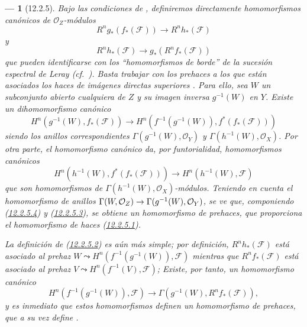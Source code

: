 \documentclass[10pt,oneside,openany]{book}
\theoremstyle{egaenv}\newtheorem*{env}{---}
\theoremstyle{egastatement}
\theoremstyle{egadescription}
\newcommand{\oldpage}[2][]{\marginnote{\normalfont\scriptsize\textbf{#1}\,|\,#2}\ignorespaces}
\renewcommand{\to}{\mathchoice{\longrightarrow}{\rightarrow}{\rightarrow}{\rightarrow}}
\begin{document}
\begin{env}[12.2.5]
\label{0.12.2.5}
\label{0.12.2.5-fr}
Bajo las condiciones de , definiremos directamente
homomorfismos canónicos de $\mathcal O_Z$-módulos
\[
\label{0.12.2.5.1-fr}
\tag{12.2.5.1}
R^n g_*(f_*(\mathcal F))\longrightarrow R^n h_*(\mathcal F)
\]
y
\[
\label{0.12.2.5.2-fr}
\tag{12.2.5.2}
R^n h_*(\mathcal F)\longrightarrow g_*(R^n f_*(\mathcal F))
\]
\oldpage[0\textsubscript{III}]{59}
que pueden identificarse con los ``homomorfismos de borde'' de la sucesión
espectral de Leray (cf.\ ).
Basta trabajar con los prehaces a los que están asociados los haces de
imágenes directas superiores .
Para ello, sea $W$ un subconjunto abierto cualquiera de $Z$ y su imagen inversa $g^{-1}(W)$ en $Y$.  Existe un
dihomomorfismo canónico
\[
\label{0.12.2.5.3-fr}
\tag{12.2.5.3}
H^n(g^{-1}(W),f_*(\mathcal F))\longrightarrow
H^n(f^{-1}(g^{-1}(W)),f^*(f_*(\mathcal F)))
\]
siendo los anillos correspondientes
$\Gamma(g^{-1}(W),\mathcal O_Y)$ y
$\Gamma(h^{-1}(W),\mathcal O_X)$.
Por otra parte, el homomorfismo canónico
 da, por funtorialidad,
homomorfismos canónicos
\[
\label{0.12.2.5.4-fr}
\tag{12.2.5.4}
H^n(h^{-1}(W),f^*(f_*(\mathcal F)))\longrightarrow
H^n(h^{-1}(W),\mathcal F)
\]
que son homomorfismos de
$\Gamma(h^{-1}(W),\mathcal O_X)$-módulos.
Teniendo en cuenta el homomorfismo de anillos
$\Gamma(W,\mathcal O_Z)\to\Gamma(g^{-1}(W),\mathcal O_Y)$, se ve que, componiendo (\hyperref[0.12.2.5.4-fr]{12.2.5.4}) y (\hyperref[0.12.2.5.3-fr]{12.2.5.3}), se obtiene un homomorfismo de prehaces, que proporciona el homomorfismo de haces (\hyperref[0.12.2.5.1-fr]{12.2.5.1}).

La definición de (\hyperref[0.12.2.5.2-fr]{12.2.5.2}) es aún más simple; por definición, $R^n h_*(\mathcal F)$ está asociado al prehaz
$W\leadsto H^n(f^{-1}(g^{-1}(W)),\mathcal F)$
mientras que $R^n f_*(\mathcal F)$ está asociado al prehaz
$V\leadsto H^n(f^{-1}(V),\mathcal F)$;
Existe, por tanto, un homomorfismo canónico
\[
H^n(f^{-1}(g^{-1}(W)),\mathcal F)\longrightarrow
\Gamma(g^{-1}(W),R^n f_*(\mathcal F)),
\]
y es inmediato que estos homomorfismos definen un homomorfismo de
prehaces, que a su vez define .
\end{env}
\end{document}

